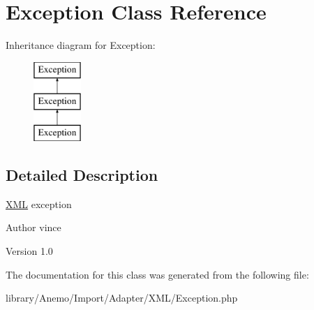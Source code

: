 \hypertarget{class_anemo_1_1_import_1_1_adapter_1_1_x_m_l_1_1_exception}{
\section{Exception Class Reference}
\label{class_anemo_1_1_import_1_1_adapter_1_1_x_m_l_1_1_exception}
}
Inheritance diagram for Exception:\begin{figure}[H]
\begin{center}
\leavevmode
\includegraphics[height=3.000000cm]{class_anemo_1_1_import_1_1_adapter_1_1_x_m_l_1_1_exception}
\end{center}
\end{figure}


\subsection{Detailed Description}
\hyperlink{class_anemo_1_1_import_1_1_adapter_1_1_x_m_l}{XML} exception \begin{DoxyAuthor}{Author}
vince 
\end{DoxyAuthor}
\begin{DoxyVersion}{Version}
1.0 
\end{DoxyVersion}


The documentation for this class was generated from the following file:\begin{DoxyCompactItemize}
\item 
library/Anemo/Import/Adapter/XML/Exception.php\end{DoxyCompactItemize}
